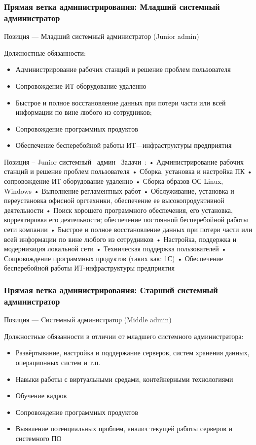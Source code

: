 \documentclass{../industrial-development}
\begin{document}
{\begin{frame} \frametitle{Прямая ветка администрирования: Младший системный администратор }
 \begin{block}{}
  \alert{Позиция --- Младший системный администратор (Junior admin)}

Должностные обязанности: 
  \end{block}
  \begin{itemize}
  \item   Администрирование рабочих станций и решение проблем пользователя
  \item  Сопровождение ИТ оборудование удаленно
  \item Быстрое и полное восстановление данных при потери части или всей информации по вине любого из сотрудников;
 \item Сопровождение программных продуктов
 \item Обеспечение бесперебойной работы ИТ---инфраструктуры предприятия
  \end{itemize}
\end{frame}

\lecturenotes
Позиция – Junior системный~\cite{hh} админ~\cite{itcf}
Задачи~\cite{rab}:
•	Администрирование рабочих станций и решение проблем пользователя
•	Сборка, установка и настройка ПК
•	сопровождение ИТ оборудование удаленно
•	Сборка образов ОС Linux, Windows
•	Выполнение регламентных работ
•	Обслуживание, установка и переустановка офисной оргтехники, обеспечение ее высокопродуктивной деятельности
•	Поиск хорошего программного обеспечения, его установка, корректировка его деятельности; обеспечение постоянной бесперебойной работы сети компании
•	Быстрое и полное восстановление данных при потери части или всей информации по вине любого из сотрудников
•	Настройка, поддержка и модернизация локальной сети
•	Техническая поддержка пользователей
•	Сопровождение программных продуктов (таких как: 1С)
•	Обеспечение бесперебойной работы ИТ-инфраструктуры предприятия

\begin{frame} \frametitle{Прямая ветка администрирования: Старший системный администратор }
 \begin{block}{}
  \alert{Позиция --- Cистемный администратор (Middle admin)}

Должностные обязанности в отличии от младшего системного администратора: 
  \end{block}
  \begin{itemize}
  \item   Развёртывание, настройка и поддержание серверов, систем хранения данных, операционных систем и т.п.
  \item Навыки работы с виртуальными средами, контейнерными технологиями
  \item Обучение кадров
 \item Сопровождение программных продуктов
 \item Выявление потенциальных проблем, анализ текущей работы серверов и системного ПО
  \end{itemize}
\end{frame}

}
\end{document}
